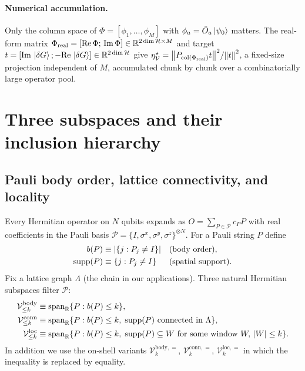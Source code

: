 \documentclass[11pt,a4paper]{article}
\newcommand{\PsiZ}{\ket{\psi_0}}
\newcommand{\dG}{\ket{\delta G}}
\newcommand{\Vbody}[1]{\mathcal{V}^{\mathrm{body}}_{\le #1}}
\newcommand{\Vconn}[1]{\mathcal{V}^{\mathrm{conn}}_{\le #1}}
\newcommand{\Vloc}[1]{\mathcal{V}^{\mathrm{loc}}_{\le #1}}
\begin{document}
\paragraph{Numerical accumulation.}  Only the column space of
$\Phi=[\phi_1,\dots,\phi_M]$ with $\phi_a=\tilde O_a\PsiZ$ matters.
The real-form matrix
$\Phi_{\rm real}=[{\rm Re}\,\Phi;\,{\rm Im}\,\Phi]\in
\mathbb R^{2\dim\mathcal H\times M}$ and target
$t=[{\rm Im}\,\dG;-{\rm Re}\,\dG]\in\mathbb R^{2\dim\mathcal H}$
give
$\eta^\star_{\mathcal V}=\norm{P_{{\rm col}(\Phi_{\rm real})}t}^2/\norm{t}^2$,
a fixed-size projection independent of $M$, accumulated chunk by
chunk over a combinatorially large operator pool.

\section{Three subspaces and their inclusion hierarchy}
\label{sec:subspaces}

\subsection{Pauli body order, lattice connectivity, and locality}

Every Hermitian operator on $N$ qubits expands as
$O=\sum_{P\in\mathcal P}c_PP$ with real coefficients in the Pauli
basis $\mathcal P=\{I,\sigma^x,\sigma^y,\sigma^z\}^{\otimes N}$.
For a Pauli string $P$ define
\begin{align}
   b(P) &\equiv |\{j:P_j\neq I\}| && \text{(body order)},\\
   {\rm supp}(P) &\equiv \{j:P_j\neq I\} && \text{(spatial support)}.
\end{align}
Fix a lattice graph $\Lambda$ (the chain in our applications).
Three natural Hermitian subspaces filter $\mathcal P$:
\begin{align}
   \Vbody{k} &\equiv {\rm span}_{\mathbb R}\{P:b(P)\le k\},\\
   \Vconn{k} &\equiv {\rm span}_{\mathbb R}\{P:b(P)\le k,\;
                       {\rm supp}(P)\text{ connected in }\Lambda\},\\
   \Vloc{k} &\equiv {\rm span}_{\mathbb R}\{P:b(P)\le k,\;
                       {\rm supp}(P)\subseteq W\text{ for some window }W,\,|W|\le k\}.
\end{align}
In addition we use the on-shell variants
$\mathcal V^{\mathrm{body},=}_{k}$,
$\mathcal V^{\mathrm{conn},=}_{k}$,
$\mathcal V^{\mathrm{loc},=}_{k}$ in which the inequality is
replaced by equality.
\end{document}
